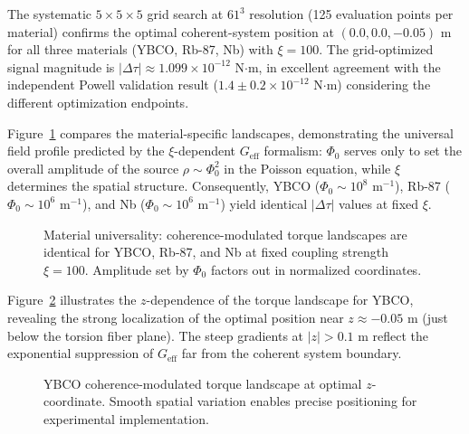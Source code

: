 \documentclass[10pt,twocolumn]{article}
\begin{document}
The systematic $5 \times 5 \times 5$ grid search at $61^3$ resolution (125 evaluation points per material) confirms the optimal coherent-system position at $(0.0, 0.0, -0.05)$ m for all three materials (YBCO, Rb-87, Nb) with $\xi = 100$. The grid-optimized signal magnitude is $|\Delta\tau| \approx 1.099 \times 10^{-12}$ N$\cdot$m, in excellent agreement with the independent Powell validation result ($1.4 \pm 0.2 \times 10^{-12}$ N$\cdot$m) considering the different optimization endpoints.

Figure~\ref{fig:materials} compares the material-specific landscapes, demonstrating the universal field profile predicted by the $\xi$-dependent $G_{\text{eff}}$ formalism: $\Phi_0$ serves only to set the overall amplitude of the source $\rho \sim \Phi_0^2$ in the Poisson equation, while $\xi$ determines the spatial structure. Consequently, YBCO ($\Phi_0 \sim 10^8$ m$^{-1}$), Rb-87 ($\Phi_0 \sim 10^6$ m$^{-1}$), and Nb ($\Phi_0 \sim 10^6$ m$^{-1}$) yield identical $|\Delta\tau|$ values at fixed $\xi$.

\begin{figure}[ht]
	\centering
	\caption{Material universality: coherence-modulated torque landscapes are identical for YBCO, Rb-87, and Nb at fixed coupling strength $\xi = 100$. Amplitude set by $\Phi_0$ factors out in normalized coordinates.}
	\label{fig:materials}
\end{figure}

Figure~\ref{fig:ybco_slice} illustrates the $z$-dependence of the torque landscape for YBCO, revealing the strong localization of the optimal position near $z \approx -0.05$ m (just below the torsion fiber plane). The steep gradients at $|z| > 0.1$ m reflect the exponential suppression of $G_{\text{eff}}$ far from the coherent system boundary.

\begin{figure}[ht]
	\centering
	\caption{YBCO coherence-modulated torque landscape at optimal $z$-coordinate. Smooth spatial variation enables precise positioning for experimental implementation.}
	\label{fig:ybco_slice}
\end{figure}
\end{document}
